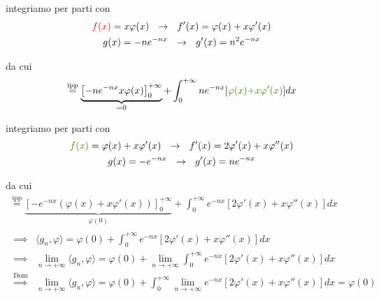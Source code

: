 \begin{enumerate}
integriamo per parti con\begin{gather*}
\textcolor[rgb]{0.82,0.01,0.11}{f}\textcolor[rgb]{0.82,0.01,0.11}{(}\textcolor[rgb]{0.82,0.01,0.11}{x}\textcolor[rgb]{0.82,0.01,0.11}{)} =x\varphi ( x) \ \ \rightarrow \ \ f'( x) =\varphi ( x) +x\varphi '( x)\\
g( x) =-ne^{-nx} \ \ \rightarrow \ \ g'( x) =n^{2} e^{-nx}
\end{gather*}

da cui\begin{equation*}
\overset{\text{ipp}}{=}\underbrace{\left[ -ne^{-nx} x\varphi ( x)\right]^{+\infty }_{0}}_{=0} +\int ^{+\infty }_{0} ne^{-nx}[\textcolor[rgb]{0.25,0.46,0.02}{\varphi }\textcolor[rgb]{0.25,0.46,0.02}{(}\textcolor[rgb]{0.25,0.46,0.02}{x}\textcolor[rgb]{0.25,0.46,0.02}{)}\textcolor[rgb]{0.25,0.46,0.02}{+x\varphi '}\textcolor[rgb]{0.25,0.46,0.02}{(}\textcolor[rgb]{0.25,0.46,0.02}{x}\textcolor[rgb]{0.25,0.46,0.02}{)}] dx
\end{equation*}

integriamo per parti con\begin{gather*}
\textcolor[rgb]{0.25,0.46,0.02}{f}\textcolor[rgb]{0.25,0.46,0.02}{(}\textcolor[rgb]{0.25,0.46,0.02}{x}\textcolor[rgb]{0.25,0.46,0.02}{)} =\varphi ( x) +x\varphi '( x) \ \ \rightarrow \ \ f'( x) =2\varphi '( x) +x\varphi ''( x)\\
g( x) =-e^{-nx} \ \ \rightarrow \ \ g'( x) =ne^{-nx}
\end{gather*}

da cui\begin{gather*}
\overset{\text{ipp}}{=}\underbrace{\left[ -e^{-nx}( \varphi ( x) +x\varphi '( x))\right]^{+\infty }_{0}}_{\varphi ( 0)} +\int ^{+\infty }_{0} e^{-nx}[ 2\varphi '( x) +x\varphi ''( x)] dx\\
\begin{aligned}
\implies  & \langle g_{n} ,\varphi \rangle =\varphi ( 0) +\int ^{+\infty }_{0} e^{-nx}[ 2\varphi '( x) +x\varphi ''( x)] dx\\
\implies  & \lim\limits _{n\rightarrow +\infty } \langle g_{n} ,\varphi \rangle =\varphi ( 0) +\lim\limits _{n\rightarrow +\infty }\int ^{+\infty }_{0} e^{-nx}[ 2\varphi '( x) +x\varphi ''( x)] dx\\
\overset{\text{Dom}}{\implies } & \lim\limits _{n\rightarrow +\infty } \langle g_{n} ,\varphi \rangle =\varphi ( 0) +\int ^{+\infty }_{0}\lim\limits _{n\rightarrow +\infty } e^{-nx}[ 2\varphi '( x) +x\varphi ''( x)] dx=\varphi ( 0)
\end{aligned}
\end{gather*}


\end{enumerate}
